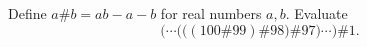Define \(a\#b=ab-a-b\) for real numbers \(a,b\). Evaluate
\[
\bigl(\cdots\bigl(\bigl((100\#99)\#98\bigr)\#97\bigr)\cdots\bigr)\#1.
\]
